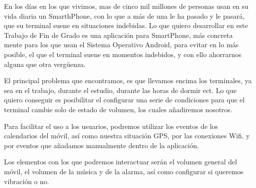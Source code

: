 

En los días en los que vivimos, mas de cinco mil millones de personas usan en su vida diaria un SmarthPhone, con lo que a más de una le ha pasado y le pasará, que su terminal suene en situaciones indebidas. Lo que quiero desarrollar en este Trabajo de Fin de Grado es una aplicación para SmartPhone, más concreta mente para los que usan el Sistema Operativo Android, para evitar en lo más posible, el que el terminal suene en momentos indebidos, y con ello ahorrarnos alguna que otra vergüenza.


El principal problema que encontramos, es que llevamos encima los terminales, ya sea en el trabajo, durante el estudio, durante las horas de dormir ect. Lo que quiero conseguir es posibilitar el configurar una serie de condiciones para que el terminal cambie solo de estado de volumen, los cuales añadiremos nosotros.


Para facilitar el uso a los usuarios, podremos utilizar los eventos de los calendarios del móvil, así como nuestra situación GPS, por las conexiones Wifi, y por eventos que añadamos manualmente dentro de la aplicación.


Los elementos con los que podremos interactuar serán el volumen general del móvil, el volumen de la música y de la alarma, así como configurar si queremos vibración o no.

\clearpage

